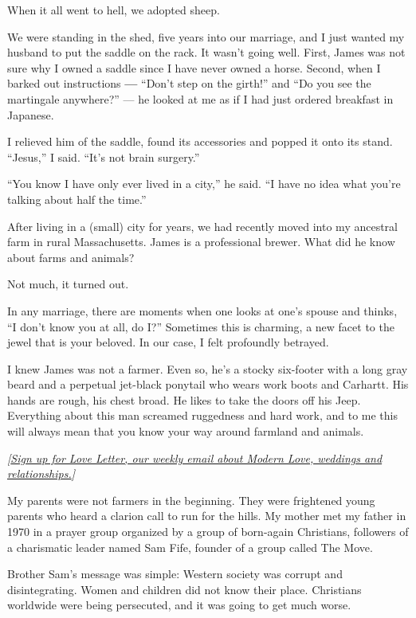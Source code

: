 When it all went to hell, we adopted sheep.

We were standing in the shed, five years into our marriage, and I just
wanted my husband to put the saddle on the rack. It wasn't going well.
First, James was not sure why I owned a saddle since I have never owned
a horse. Second, when I barked out instructions \textbf{---} ``Don't
step on the girth!'' and ``Do you see the martingale anywhere?'' --- he
looked at me as if I had just ordered breakfast in Japanese.

I relieved him of the saddle, found its accessories and popped it onto
its stand. ``Jesus,'' I said. ``It's not brain surgery.''

``You know I have only ever lived in a city,'' he said. ``I have no idea
what you're talking about half the time.''

After living in a (small) city for years, we had recently moved into my
ancestral farm in rural Massachusetts. James is a professional brewer.
What did he know about farms and animals?

Not much, it turned out.

In any marriage, there are moments when one looks at one's spouse and
thinks, ``I don't know you at all, do I?'' Sometimes this is charming, a
new facet to the jewel that is your beloved. In our case, I felt
profoundly betrayed.

I knew James was not a farmer. Even so, he's a stocky six-footer with a
long gray beard and a perpetual jet-black ponytail who wears work boots
and Carhartt. His hands are rough, his chest broad. He likes to take the
doors off his Jeep. Everything about this man screamed ruggedness and
hard work, and to me this will always mean that you know your way around
farmland and animals.

\emph{{[}}\href{https://www.nytimes3xbfgragh.onion/newsletters/love-letter}{\emph{Sign
up for Love Letter, our weekly email about Modern Love, weddings and
relationships.}}\emph{{]}}

My parents were not farmers in the beginning. They were frightened young
parents who heard a clarion call to run for the hills. My mother met my
father in 1970 in a prayer group organized by a group of born-again
Christians, followers of a charismatic leader named Sam Fife, founder of
a group called The Move.

Brother Sam's message was simple: Western society was corrupt and
disintegrating. Women and children did not know their place. Christians
worldwide were being persecuted, and it was going to get much worse.

